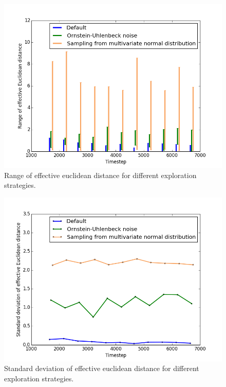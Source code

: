 \documentclass{article}
\begin{document}
\begin{figure}
\begin{center}
\includegraphics[scale=0.4]{action_exploration_range}
\end{center}
\caption{Range of effective euclidean distance for different exploration strategies.}
\label{fig:action_exploration_range}
\end{figure}

\begin{figure}
\begin{center}
\includegraphics[scale=0.4]{action_exploration_std_dev}
\end{center}
\caption{Standard deviation of effective euclidean distance for different exploration strategies.}
\label{fig:action_exploration_std_dev}
\end{figure}
\end{document}
